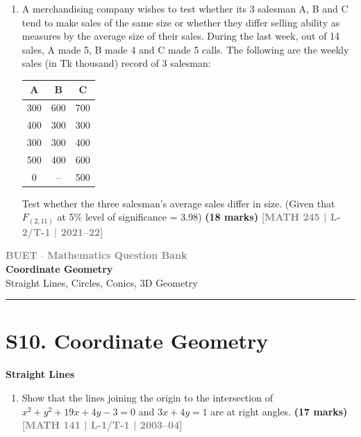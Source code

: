 \documentclass[12pt,a4paper]{article}
\newcommand{\yr}[1]{\hfill\textcolor{gray}{\small\textbf{[#1]}}}
\newcommand{\mk}[1]{\textcolor{orange!70!black}{\small\textbf{(#1 marks)}}}
\newcommand{\subtopic}[2]{%
  \vspace{10pt}
  \noindent\begin{tcolorbox}[colback=#1!8,colframe=#1,boxrule=0.6pt,arc=4pt,
    left=6pt,right=6pt,top=4pt,bottom=4pt]
    \small\bfseries\textcolor{#1}{#2}
  \end{tcolorbox}
  \vspace{2pt}
}
\newcommand{\secdivider}[3]{%
  \newpage\thispagestyle{empty}%
  \vspace*{\fill}%
  \begin{tcolorbox}[enhanced,colback=#3!6,colframe=#3,boxrule=1.5pt,arc=8pt,
    left=20pt,right=20pt,top=22pt,bottom=22pt,
    shadow={3pt}{-3pt}{0pt}{black!15}]
    \centering
    {\large\textcolor{gray}{\textbf{BUET $\cdot$ Mathematics Question Bank}}}\\[8pt]
    {\fontsize{26}{32}\selectfont\bfseries\textcolor{#3}{#1}}\\[6pt]
    {\fontsize{15}{19}\selectfont\textcolor{dgray}{#2}}\\[12pt]
    \textcolor{#3!60}{\rule{0.5\textwidth}{0.5pt}}
  \end{tcolorbox}%
  \vspace*{\fill}\newpage%
}
\begin{document}
\begin{enumerate}\item A merchandising company wishes to test whether its 3 salesman A, B and C tend to make sales of the same size or whether they differ selling ability as measures by the average size of their sales. During the last week, out of 14 sales, A made 5, B made 4 and C made 5 calls. The following are the weekly sales (in Tk thousand) record of 3 salesman:
\begin{center}
  \begin{tabular}{|c|c|c|}
\hline
A   & B   & C   \\ \hline
300 & 600 & 700 \\ \hline
400 & 300 & 300 \\ \hline
300 & 300 & 400 \\ \hline
500 & 400 & 600 \\ \hline
0   & --  & 500 \\ \hline
\end{tabular}
\end{center}

\vspace{0.2cm}

Test whether the three salesman's average sales differ in size. (Given that $F_{(2,11)}$ at 5\% level of significance = 3.98)
\mk{18} \yr{MATH 245 | L-2/T-1 | 2021--22}

\end{enumerate}


\secdivider{Coordinate Geometry}{Straight Lines, Circles, Conics, 3D Geometry}{cH}

\section{S10. Coordinate Geometry}
\label{sec:S10}

\subtopic{cH}{Straight Lines}
\label{sub:s10-lines}

\begin{enumerate}\item Show that the lines joining the origin to the intersection of $x^{2}+y^{2}+19x+4y-3=0$ and $3x+4y=1$ are at right angles.
\mk{17} \yr{MATH 141 | L-1/T-1 | 2003--04}

\end{enumerate}
\end{document}
